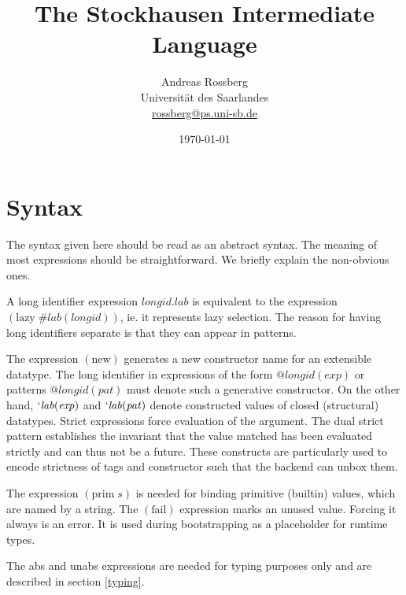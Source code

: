 \documentclass[twoside]{article}
\newcommand{\x}[1]{\mathit{#1}}
\newcommand{\f}[1]{\mbox{#1}}
\newcommand{\lab}{\x{lab}}
\newcommand{\longid}{\x{longid}}
\renewcommand{\exp}{\x{exp}}
\newcommand{\pat}{\x{pat}}
\begin{document}

\title{The Stockhausen Intermediate Language}
\author{Andreas Rossberg \\
Universit\"at des Saarlandes \\
\url{rossberg@ps.uni-sb.de}}
\date{\today}

\maketitle


\section{Syntax}
\label{syntax}

The syntax given here should be read as an abstract syntax. The meaning of most expressions should be straightforward. We briefly explain the non-obvious ones.

A long identifier expression $\longid.\lab$ is equivalent to the expression $(\f{lazy}\; \#\lab(\longid))$, ie. it represents lazy selection. The reason for having long identifiers separate is that they can appear in patterns.

The expression $(\f{new})$ generates a new constructor name for an extensible datatype. The long identifier in expressions of the form $@\longid(\exp)$ or patterns $@\longid(\pat)$ must denote such a generative constructor. On the other hand, $`\lab(\exp)$ and $`\lab(\pat)$ denote constructed values of closed (structural) datatypes. Strict expressions force evaluation of the argument. The dual strict pattern establishes the invariant that the value matched has been evaluated strictly and can thus not be a future. These constructs are particularly used to encode strictness of tags and constructor such that the backend can unbox them.

The expression $(\f{prim}\;s)$ is needed for binding primitive (builtin) values, which are named by a string. The $(\f{fail})$ expression marks an unused value. Forcing it always is an error. It is used during bootstrapping as a placeholder for runtime types.

The \f{abs} and \f{unabs} expressions are needed for typing purposes only and are described in section \ref{typing}.
\end{document}
